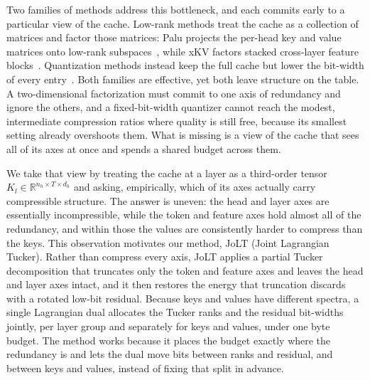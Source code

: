 \documentclass{article}
\begin{document}
Two families of methods address this bottleneck, and each commits early to a particular view of the cache. Low-rank methods treat the cache as a collection of matrices and factor those matrices: Palu projects the per-head key and value matrices onto low-rank subspaces~\citep{chang2024palu}, while xKV factors stacked cross-layer feature blocks~\citep{chang2025xkv}. Quantization methods instead keep the full cache but lower the bit-width of every entry~\citep{liu2024kivi,turboquant2025}. Both families are effective, yet both leave structure on the table. A two-dimensional factorization must commit to one axis of redundancy and ignore the others, and a fixed-bit-width quantizer cannot reach the modest, intermediate compression ratios where quality is still free, because its smallest setting already overshoots them. What is missing is a view of the cache that sees all of its axes at once and spends a shared budget across them.

We take that view by treating the cache at a layer as a third-order tensor $K_l \in \mathbb{R}^{n_h \times T \times d_h}$ and asking, empirically, which of its axes actually carry compressible structure. The answer is uneven: the head and layer axes are essentially incompressible, while the token and feature axes hold almost all of the redundancy, and within those the values are consistently harder to compress than the keys. This observation motivates our method, JoLT (Joint Lagrangian Tucker). Rather than compress every axis, JoLT applies a partial Tucker decomposition that truncates only the token and feature axes and leaves the head and layer axes intact, and it then restores the energy that truncation discards with a rotated low-bit residual. Because keys and values have different spectra, a single Lagrangian dual allocates the Tucker ranks and the residual bit-widths jointly, per layer group and separately for keys and values, under one byte budget. The method works because it places the budget exactly where the redundancy is and lets the dual move bits between ranks and residual, and between keys and values, instead of fixing that split in advance.
\end{document}
